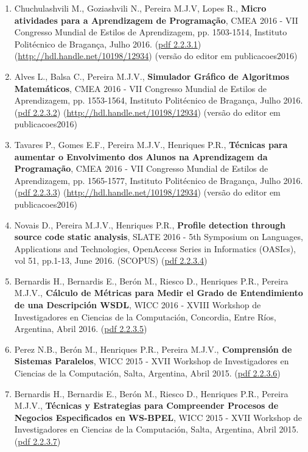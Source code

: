 \documentclass[11pt]{article}
\begin{document}
\begin{enumerate}
\item {Chuchulashvili M., Goziashvili N., Pereira M.J.V, Lopes R., {\bf{ Micro atividades para a Aprendizagem de Programação}}, CMEA 2016 - VII Congresso Mundial de Estilos de Aprendizagem, pp. 1503-1514, Instituto Politécnico de Bragança, Julho 2016. (\href{run:Publicacoes/publicacoes/91.pdf}{pdf 2.2.3.1}) (\url{http://hdl.handle.net/10198/12934}) (versão do editor em publicacoes2016)}
\item {Alves L., Balsa C., Pereira M.J.V., {\bf{ Simulador Gráfico de Algoritmos Matemáticos}}, CMEA 2016 - VII Congresso Mundial de Estilos de Aprendizagem, pp. 1553-1564, Instituto Politécnico de Bragança, Julho 2016. (\href{run:Publicacoes/publicacoes/90.pdf}{pdf 2.2.3.2}) (\url{http://hdl.handle.net/10198/12934}) (versão do editor em publicacoes2016)}
\item {Tavares P., Gomes E.F., Pereira M.J.V., Henriques P.R., {\bf{ Técnicas para aumentar o Envolvimento dos Alunos na Aprendizagem da Programação}}, CMEA 2016 - VII Congresso Mundial de Estilos de Aprendizagem, pp. 1565-1577, Instituto Politécnico de Bragança, Julho 2016. (\href{run:Publicacoes/publicacoes/89.pdf}{pdf 2.2.3.3}) (\url{http://hdl.handle.net/10198/12934}) (versão do editor em publicacoes2016)}
\item {Novais D., Pereira M.J.V., Henriques P.R., {\bf{ Profile detection through source code static analysis}}, SLATE 2016 - 5th Symposium on Languages, Applications and Technologies, OpenAccess Series in Informatics (OASIcs), vol 51, pp.1-13, June 2016. (SCOPUS) (\href{run:Publicacoes/publicacoes/88.pdf}{pdf 2.2.3.4})}
\item {Bernardis H., Bernardis E., Berón M., Riesco D., Henriques P.R., Pereira M.J.V.,{\bf{ Cálculo de Métricas para Medir el Grado de Entendimiento de una Descripción WSDL}}, WICC 2016 - XVIII Workshop de Investigadores en Ciencias de la Computación, Concordia, Entre Ríos, Argentina, Abril 2016. (\href{run:Publicacoes/publicacoes/87.pdf}{pdf 2.2.3.5})}
\item {Perez N.B., Berón M., Henriques P.R., Pereira M.J.V.,{\bf{ Comprensión de Sistemas Paralelos}}, WICC 2015 - XVII Workshop de Investigadores en Ciencias de la Computación, Salta, Argentina, Abril 2015. (\href{run:Publicacoes/publicacoes/80.pdf}{pdf 2.2.3.6})}
\item {Bernardis H., Bernardis E., Berón M., Riesco D., Henriques P.R., Pereira M.J.V., {\bf{ Técnicas y Estrategias para Compreender Procesos de Negocios Especificados en WS-BPEL}}, WICC 2015 - XVII Workshop de Investigadores en Ciencias de la Computación, Salta, Argentina, Abril 2015. (\href{run:Publicacoes/publicacoes/82.pdf}{pdf 2.2.3.7})}

\end{enumerate}
\end{document}

